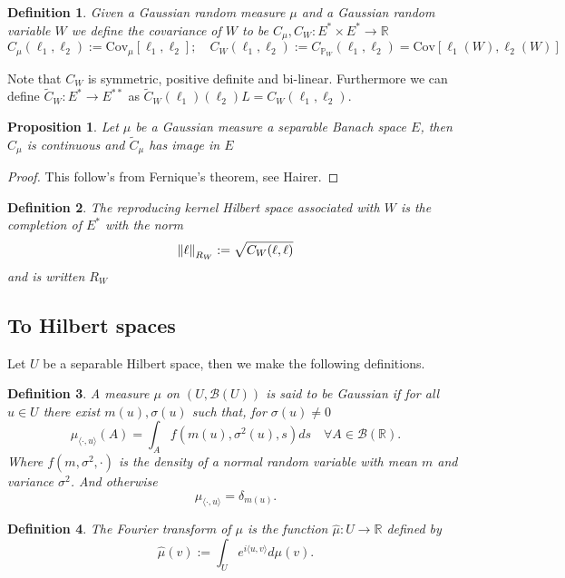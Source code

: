 \documentclass[12pt]{article}
\newcommand{\R}{{\mathbb R}}
\newtheorem{proposition}{Proposition}
\newtheorem{definition}{Definition}
\begin{document}
\begin{definition}
	Given a Gaussian random measure $\mu$ and a Gaussian random variable $W$ we define the covariance of $W$ to be $C_\mu,C_W:E^*\times E^*\to \R$
	\begin{equation*}
		C_\mu(\ell_1,\ell_2):=\mathrm{Cov}_\mu[\ell_1,\ell_2];\quad C_W(\ell_1,\ell_2):=C_{\mathbb{P}_W}(\ell_1,\ell_2)=\mathrm{Cov}[\ell_1(W),\ell_2(W)]
	\end{equation*}
\end{definition}
Note that $C_W$ is symmetric, positive definite and bi-linear. Furthermore we can define $\tilde{C}_W:E^*\to E^{**}$ as $\tilde{C}_W(\ell_1)(\ell_2)L={C}_W(\ell_1,\ell_2)$.
\begin{proposition}
	Let $\mu$ be a Gaussian measure a separable Banach space $E$, then $C_\mu$ is continuous and $\tilde{C}_\mu$ has image in $E$
\end{proposition}
\begin{proof}
	This follow's from Fernique's theorem, see Hairer.
\end{proof}
\begin{definition}
	The \emph{reproducing kernel Hilbert space associated with $W$} is the completion of $E^*$ with the norm
	\begin{equation*}
		\norm{\ell}_{R_W}:=\sqrt{ C_W(\ell,\ell)}
	\end{equation*}
	and is written $R_W$
\end{definition}
\subsection{To Hilbert spaces}
Let $U$ be a separable Hilbert space, then we make the following definitions.
\begin{definition}\label{Gaussian measure}
	A measure $\mu$ on  \((U,\mathcal{B}(U))\) is said to be Gaussian if
	for all \(u\in U\) there exist \(m(u),\sigma(u)\) such that, for \(\sigma(u)\neq 0\)
	\[\mu_{\langle\cdot,u\rangle}(A)=\int_A f(m(u),\sigma^2(u),s)ds\quad\forall A\in\mathcal{B}(\mathbb{R}).\]
	Where $f(m,\sigma^2,\cdot)$ is the density of a normal random variable with mean $m$ and variance $\sigma^2$.
	And otherwise
	\[\mu_{\langle\cdot,u\rangle}=\delta_{m(u)}.\]
\end{definition}
\begin{definition}
	The Fourier transform of $\mu$ is the function $\hat{\mu}:U\to\R$ defined by
	\[\hat{\mu}(v):=\int_U e^{i\langle u,v\rangle}d\mu(v).\]
\end{definition}
\end{document}
